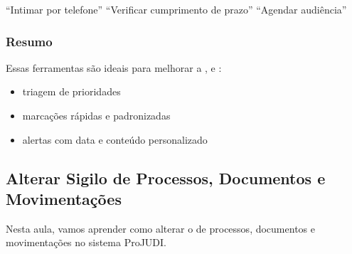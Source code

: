 \documentclass[letterpaper,10pt,brazil]{sphinxmanual}
\begin{document}
\sphinxAtStartPar
{}
\sphinxhyphen{} “Intimar por telefone”
\sphinxhyphen{} “Verificar cumprimento de prazo”
\sphinxhyphen{} “Agendar audiência”


\subsubsection{Resumo}
\label{\detokenize{projud_12_favoritar:resumo}}
\sphinxAtStartPar
Essas ferramentas são ideais para melhorar a ,  e :
\begin{itemize}
\item {} 
\sphinxAtStartPar
{} triagem de prioridades

\item {} 
\sphinxAtStartPar
{} marcações rápidas e padronizadas

\item {} 
\sphinxAtStartPar
{} alertas com data e conteúdo personalizado

\end{itemize}

\sphinxstepscope


\subsection{Alterar Sigilo de Processos, Documentos e Movimentações}
\label{\detokenize{projud_13_alterarsigilo:alterar-sigilo-de-processos-documentos-e-movimentacoes}}\label{\detokenize{projud_13_alterarsigilo::doc}}
\sphinxAtStartPar
Nesta aula, vamos aprender como alterar o  de processos, documentos e movimentações no sistema ProJUDI.
\end{document}
